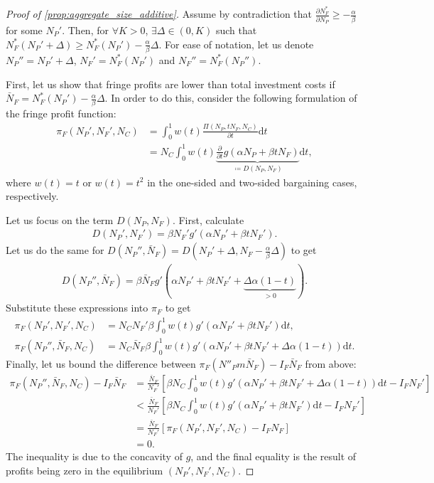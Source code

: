 \documentclass[a4paper]{article}
\newcommand{\dt}{\mathrm{d}t}
\begin{document}
\begin{proof}[Proof of \cref{prop:aggregate_size_additive}]
    Assume by contradiction that $\frac{\partial N_F^*}{\partial N_P} \geq -\frac{\alpha}{\beta}$ for some $N_P'$.
    Then, for $\forall K > 0$, $\exists \Delta \in (0, K)$ such that $N_F^*(N_P' + \Delta) \geq N_F^*(N_P') - \frac{\alpha}{\beta}\Delta$. For ease of notation, let us denote $N_P'' = N_P' + \Delta$, $N_F' = N_F^*(N_P')$ and $N_F'' = N_F^*(N_P'')$.

    First, let us show that fringe profits are lower than total investment costs if $\bar N_F = N_F^*(N_P') - \frac{\alpha}{\beta}\Delta$.
    In order to do this, consider the following formulation of the fringe profit function:
    \begin{align*}
        \pi_F(N_P', N_F', N_C) &= \int_0^1 w(t) \frac{\Pi(N_P, t N_F, N_C)}{\partial t} \dt \\
        &= N_C \int_0^1 w(t) \underbrace{\frac{\partial}{\partial t}g(\alpha N_P + \beta t N_F)}_{\coloneq D(N_P, N_F)} \dt,
    \end{align*}
    where $w(t) = t$ or $w(t) = t^2$ in the one-sided and two-sided bargaining cases, respectively.

    Let us focus on the term $D(N_P, N_F)$.
    First, calculate
    \begin{align*}
        D(N_P', N_F') = \beta N_F' g'(\alpha N_P' + \beta t N_F').
    \end{align*}
    Let us do the same for $D(N_P'', \bar{N}_F) = D(N_P' + \Delta, N_F - \frac{\alpha}{\beta} \Delta)$ to get
    \begin{align*}
        D(N_P'', \bar{N}_F) = \beta \bar{N}_F g'(\alpha N_P' + \beta t N_F' + \underbrace{\Delta \alpha (1-t)}_{> 0}).
    \end{align*}
    Substitute these expressions into $\pi_F$ to get
    \begin{align*}
        \pi_F(N_P', N_F', N_C) &= N_C N_F' \beta \int_0^1 w(t) g'(\alpha N_P' + \beta t N_F') \dt, \\
        \pi_F(N_P'', \bar{N}_F, N_C) &= N_C \bar{N}_F \beta \int_0^1 w(t) g'(\alpha N_P' + \beta t N_F' + \Delta \alpha (1-t)) \dt.
    \end{align*}
    Finally, let us bound the difference between $\pi_F(N''_Pm \bar{N}_F) - I_F \bar{N}_F$ from above:
    \begin{align*}
        \pi_F(N_P'', \bar{N}_F, N_C) - I_F \bar{N}_F &= \frac{\bar{N}_F}{N_F'}\left[\beta N_C \int_0^1 w(t) g'(\alpha N_P' + \beta t N_F' + \Delta \alpha (1-t)) \dt - I_F N_F' \right] \\
        &< \frac{\bar{N}_F}{N_F'}\left[\beta N_C \int_0^1 w(t) g'(\alpha N_P' + \beta t N_F') \dt - I_F N_F' \right] \\
        &= \frac{\bar{N}_F}{N_F'}\left[ \pi_F(N_P', N_F', N_C) - I_F N_F \right] \\
        &= 0.
    \end{align*}
    The inequality is due to the concavity of $g$, and the final equality is the result of profits being zero in the equilibrium $(N_P', N_F', N_C)$.


\end{proof}
\end{document}
